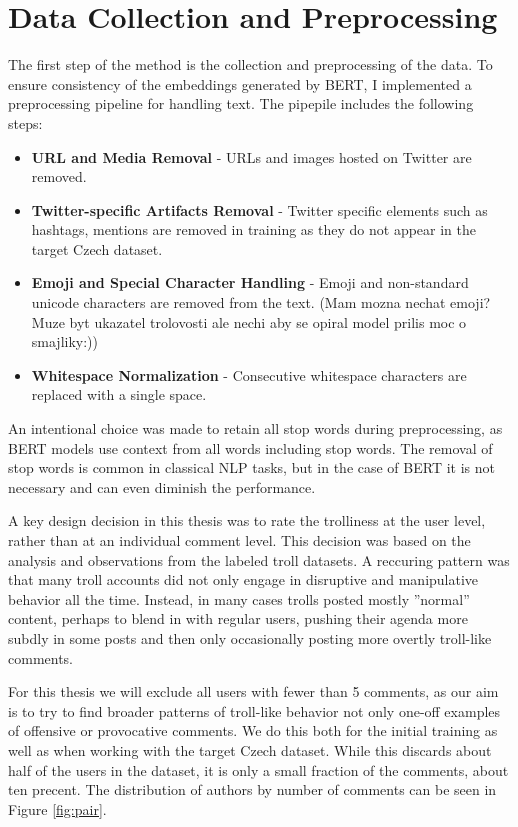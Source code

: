\documentclass[twoside]{ctuthesis}
\theoremstyle{plain}
\theoremstyle{definition}
\theoremstyle{note}
\begin{document}
\section{Data Collection and Preprocessing}
The first step of the method is the collection and preprocessing of the data. To ensure consistency of the embeddings generated by BERT, I implemented a preprocessing pipeline for handling text. The pipepile includes the following steps:
\begin{itemize}
	\item \textbf{URL and Media Removal} - URLs and images hosted on Twitter are removed.
	\item \textbf{Twitter-specific Artifacts Removal} - Twitter specific elements such as hashtags, mentions are removed in training as they do not appear in the target Czech dataset.
	\item \textbf{Emoji and Special Character Handling} - Emoji and non-standard unicode characters are removed from the text. (Mam mozna nechat emoji? Muze byt ukazatel trolovosti ale nechi aby se opiral model prilis moc o smajliky:))
	\item \textbf{Whitespace Normalization} - Consecutive whitespace characters are replaced with a single space.
\end{itemize}
An intentional choice was made to retain all stop words during preprocessing, as BERT models use context from all words including stop words. The removal of stop words is common in classical NLP tasks, but in the case of BERT it is not necessary and can even diminish the performance.\par

A key design decision in this thesis was to rate the trolliness at the user level, rather than at an individual comment level. This decision was based on the analysis and observations from the labeled troll datasets. A reccuring pattern was that many troll accounts did not only engage in disruptive and manipulative behavior all the time. Instead, in many cases trolls posted mostly ''normal'' content, perhaps to blend in with regular users, pushing their agenda more subdly in some posts and then only occasionally posting more overtly troll-like comments.\par
For this thesis we will exclude all users with fewer than 5 comments, as our aim is to try to find broader patterns of troll-like behavior not only one-off examples of offensive or provocative comments. We do this both for the initial training as well as when working with the target Czech dataset. While this discards about half of the users in the dataset, it is only a small fraction of the comments, about ten precent. The distribution of authors by number of comments can be seen in Figure \ref{fig:pair}.\par
\end{document}
